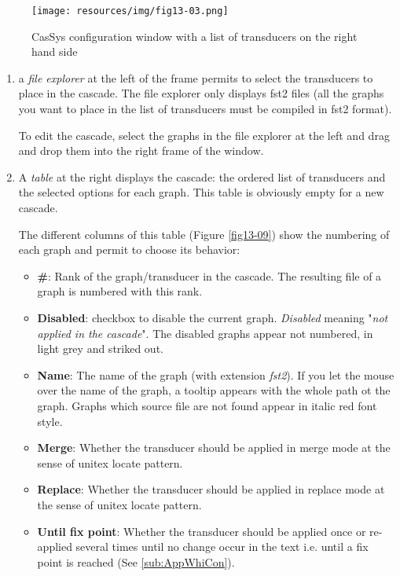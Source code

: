 \begin{figure}[!htb]
  \centering
  \texttt{[image: resources/img/fig13-03.png]}
  \caption{CasSys configuration window with a list of transducers on the right hand side}
  \label{fig13-03}
\end{figure}

\begin{enumerate}
	\item a \textit{file explorer} at the left of the frame permits to select the transducers to place in the cascade. 
	The file explorer only displays fst2 files (all the graphs you want to place in the list of transducers must be compiled in fst2 format). 
	
	To edit the cascade, select the graphs in the file explorer at the left and drag and drop them into the right frame of the window.
	\item A \textit{table} at the right displays the cascade: the ordered list of transducers and the selected options for each graph.
		This table is obviously empty for a new cascade. 
	 
	The different columns of this table (Figure \ref{fig13-09}) show the numbering of each graph and permit to choose its behavior:
	\begin{itemize}
		  \item \textbf{\#}: Rank of the graph/transducer in the cascade. The resulting file of a graph is numbered with this rank.
		  \item \textbf{Disabled}: checkbox to disable the current graph. \textit{Disabled} meaning "\textit{not applied in the cascade}". The disabled graphs appear not numbered, in light grey and striked out.
			\item \textbf{Name}: The name of the graph (with extension \emph{fst2}). If you let the mouse over the name of the graph, a tooltip appears with the whole path ot the graph. Graphs which source file are not found appear in italic red font style.
		  \item \textbf{Merge}: Whether the transducer should be applied in merge mode at the sense of unitex locate pattern.
			\item \textbf{Replace}: Whether the transducer should be applied in replace mode at the sense of unitex locate pattern.
		  \item \textbf{Until fix point}: Whether the transducer should be applied once or re-applied several times until no change occur in the text i.e. until a fix point is reached (See \ref{sub:AppWhiCon}).
	\end{itemize}


\end{enumerate}
